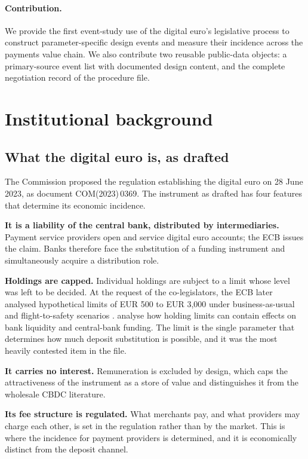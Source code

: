 \documentclass[11pt]{article}
\theoremstyle{plain}\newtheorem{proposition}{Proposition}
\begin{document}
\paragraph{Contribution.} We provide the first event-study use of the digital euro's legislative process to construct parameter-specific design events and measure their incidence across the payments value chain. We also contribute two reusable public-data objects: a primary-source event list with documented design content, and the complete negotiation record of the procedure file.

\section{Institutional background}\label{sec:inst}

\subsection{What the digital euro is, as drafted}

The Commission proposed the regulation establishing the digital euro on 28 June 2023, as document COM(2023)\,0369. The instrument as drafted has four features that determine its economic incidence.

\textbf{It is a liability of the central bank, distributed by intermediaries.} Payment service providers open and service digital euro accounts; the ECB issues the claim. Banks therefore face the substitution of a funding instrument and simultaneously acquire a distribution role.

\textbf{Holdings are capped.} Individual holdings are subject to a limit whose level was left to be decided. At the request of the co-legislators, the ECB later analysed hypothetical limits of EUR 500 to EUR 3,000 under business-as-usual and flight-to-safety scenarios \citep{ecb2025}. \citet{lambert2024} analyse how holding limits can contain effects on bank liquidity and central-bank funding. The limit is the single parameter that determines how much deposit substitution is possible, and it was the most heavily contested item in the file.

\textbf{It carries no interest.} Remuneration is excluded by design, which caps the attractiveness of the instrument as a store of value and distinguishes it from the wholesale CBDC literature.

\textbf{Its fee structure is regulated.} What merchants pay, and what providers may charge each other, is set in the regulation rather than by the market. This is where the incidence for payment providers is determined, and it is economically distinct from the deposit channel.
\end{document}

